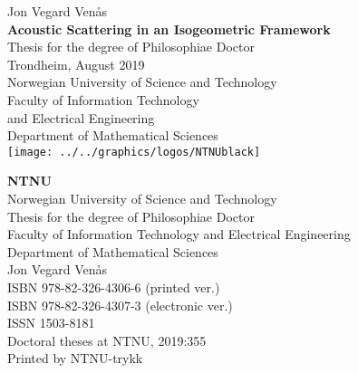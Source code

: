 \thispagestyle{empty}%
\begin{titlepage}
\begin{adjustwidth}{1.7cm}{1.7cm}
    \null%
    \raggedright%
    \LARGE\textcolor{black!60}{Jon Vegard Ven{\aa}s}\\
	\vspace{2cm}%
	\huge%
	\textbf{Acoustic Scattering in an Isogeometric Framework}\\
	\vspace{6.5cm}%
	\large%
	Thesis for the degree of Philosophiae Doctor\\
	\vspace{\baselineskip}%
	Trondheim, August 2019\\
	\vspace{\baselineskip}%
	Norwegian University of Science and Technology\\
	Faculty of Information Technology\\
	and Electrical Engineering\\
	Department of Mathematical Sciences\\
	\vspace*{1.7cm}%
	\texttt{[image: ../../graphics/logos/NTNUblack]}
\end{adjustwidth}        
\end{titlepage}
\newpage
\thispagestyle{empty}%
\begin{adjustwidth}{1.2cm}{1.2cm}
	\null\vspace{12cm}%
	\raggedright\footnotesize%
	\textbf{NTNU}\\
	Norwegian University of Science and Technology\\
	\vspace{\baselineskip}%
	Thesis for the degree of Philosophiae Doctor\\
	\vspace{\baselineskip}%
	Faculty of Information Technology and Electrical Engineering\\
	Department of Mathematical Sciences\\
	\vspace{\baselineskip}%
	\textcopyright\xspace Jon Vegard Ven{\aa}s\\
	\vspace{\baselineskip}%
	ISBN 978-82-326-4306-6 (printed ver.)\\
	ISBN 978-82-326-4307-3 (electronic ver.)\\
	ISSN 1503-8181\\
	\vspace{\baselineskip}%
	Doctoral theses at NTNU, 2019:355\\
	\vspace{\baselineskip}%
	Printed by NTNU-trykk
\end{adjustwidth}        
